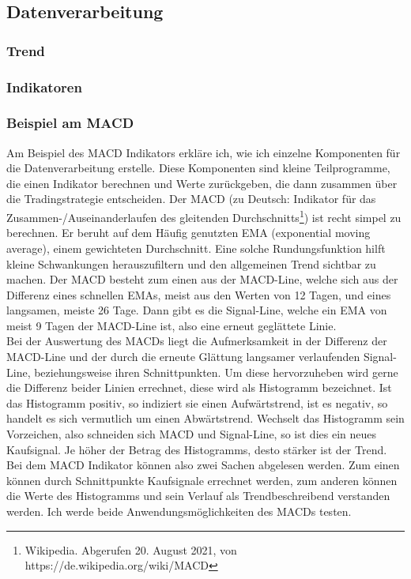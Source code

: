 \documentclass[12pt]{article}
\begin{document}
\subsection{Datenverarbeitung}
	\subsubsection{Trend}
	\subsubsection{Indikatoren}
	\subsubsection{Beispiel am MACD}
		Am Beispiel des MACD Indikators erkläre ich, wie ich einzelne Komponenten für die Datenverarbeitung erstelle. Diese Komponenten sind kleine Teilprogramme, die einen Indikator berechnen und Werte zurückgeben, die dann zusammen über die Tradingstrategie entscheiden.
		Der MACD (zu Deutsch: Indikator für das Zusammen-/Auseinanderlaufen des gleitenden Durchschnitts\footnote{Wikipedia. Abgerufen 20. August 2021, von https://de.wikipedia.org/wiki/MACD}) ist recht simpel zu berechnen. Er beruht auf dem Häufig genutzten EMA (exponential moving average), einem gewichteten Durchschnitt. Eine solche Rundungsfunktion hilft kleine Schwankungen herauszufiltern und den allgemeinen Trend sichtbar zu machen. Der MACD besteht zum einen aus der MACD-Line, welche sich aus der Differenz eines schnellen EMAs, meist aus den Werten von 12 Tagen, und eines langsamen, meiste 26 Tage. Dann gibt es die Signal-Line, welche ein EMA von meist 9 Tagen der MACD-Line ist, also eine erneut geglättete Linie.\\
		Bei der Auswertung des MACDs liegt die Aufmerksamkeit in der Differenz der MACD-Line und der durch die erneute Glättung langsamer verlaufenden Signal-Line, beziehungsweise ihren Schnittpunkten. Um diese hervorzuheben wird gerne die Differenz beider Linien errechnet, diese wird als Histogramm bezeichnet. Ist das Histogramm positiv, so indiziert sie einen Aufwärtstrend, ist es negativ, so handelt es sich vermutlich um einen Abwärtstrend. Wechselt das Histogramm sein Vorzeichen, also schneiden sich MACD und Signal-Line, so ist dies ein neues Kaufsignal. Je höher der Betrag des Histogramms, desto stärker ist der Trend.\\
		Bei dem MACD Indikator können also zwei Sachen abgelesen werden. Zum einen können durch Schnittpunkte Kaufsignale errechnet werden, zum anderen können die Werte des Histogramms und sein Verlauf als Trendbeschreibend verstanden werden. Ich werde beide Anwendungsmöglichkeiten des MACDs testen.
\end{document}
